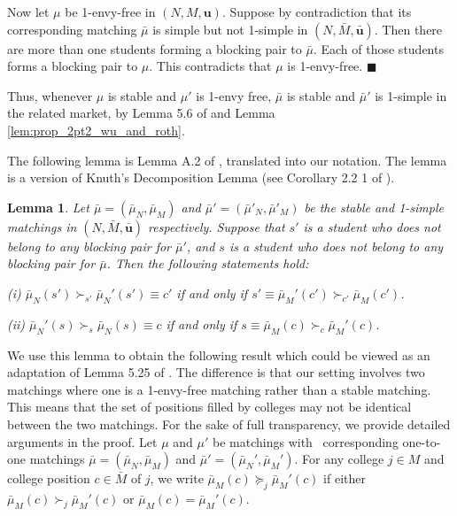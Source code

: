 \documentclass[12pt, fullpage]{amsart}
\newtheorem{lemma}{Lemma}[section]
\theoremstyle{definition}
\theoremstyle{definition}
\theoremstyle{definition}
\begin{document}
\begin{bibunit}[econometrica]
Now let $\mu$ be 1-envy-free in $(N,M,\boldsymbol{u})$. Suppose
by contradiction that its corresponding matching $\bar{\mu}$ is simple but not 1-simple in $(N,\bar{M},\boldsymbol{\bar{u}})$. Then there are more than one students forming a blocking pair to $\bar{\mu}$. Each of those students forms a blocking pair to $\mu$. This contradicts that $\mu$ is 1-envy-free. $\blacksquare$\medskip

Thus, whenever $\mu$ is stable and $\mu'$ is 1-envy free, $\bar{\mu}$ is stable and $\bar{\mu}'$ is 1-simple in the related market, by Lemma 5.6 of \citet{Roth/Sotomayor:90:TwoSidedMatching} and Lemma \ref{lem:prop_2pt2_wu_and_roth}. 

The following lemma is Lemma A.2 of \cite{Blum/Roth/Rothblum:1997:JET}, translated into our notation. The lemma is a version of Knuth's Decomposition Lemma (see Corollary 2.2 1 of \citet{Roth/Sotomayor:90:TwoSidedMatching}).

\begin{lemma}
	\label{lemm: decomp}
	Let $\bar{\mu}=(\bar{\mu}_{N},\bar{\mu}_{M})$
	and $\bar{\mu}'=(\bar{\mu}'_{N},\bar{\mu}'_{M})$ be the stable and
	1-simple matchings in $(N,\bar{M},\boldsymbol{\bar{u}})$ respectively. Suppose that $s'$ is a student who does not belong to any blocking pair for $\bar \mu'$, and $s$ is a student who does not belong to any blocking pair for $\bar \mu$. Then the following statements hold:
	
	(i) $\bar \mu_N(s') \succ_{s'} \bar \mu_N'(s') \equiv c'$ if and only if $s' \equiv \bar \mu_M'(c') \succ_{c'} \bar \mu_M(c')$.
	
	(ii) $\bar \mu_N'(s) \succ_{s} \bar \mu_N(s) \equiv c$ if and only if $s \equiv \bar \mu_M(c) \succ_{c} \bar \mu_M'(c)$.
\end{lemma}

We use this lemma to obtain the following result which could be viewed as an adaptation of Lemma 5.25 of \cite{Roth/Sotomayor:90:TwoSidedMatching}. The difference is that our setting involves two matchings where one is a 1-envy-free matching rather than a stable matching. This means that  the set of positions filled by colleges may not be identical between the two matchings. For the sake of full transparency, we provide detailed arguments in the proof. Let $\mu$ and $\mu'$ be matchings with  corresponding one-to-one matchings $\bar{\mu}=(\bar{\mu}_{N},\bar{\mu}_{M})$ and $\bar{\mu}'=(\bar{\mu}_{N}',\bar{\mu}_{M}')$. For any college $j\in M$ and college position $c\in \bar{M}$ of $j$, we write $\bar{\mu}_{M}(c)\succeq_{j}\bar{\mu}_{M}'(c)$ if either $\bar{\mu}_{M}(c)\succ_{j}\bar{\mu}_{M}'(c)$ or $\bar{\mu}_{M}(c)=\bar{\mu}_{M}'(c)$.


\end{bibunit}
\end{document}
